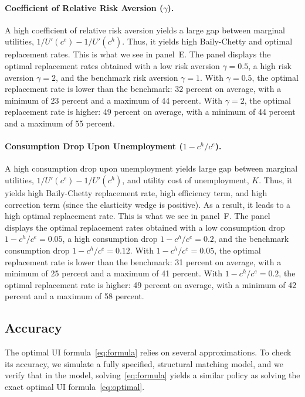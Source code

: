 \documentclass[letterpaper,12pt,leqno]{article}
\def \g{{\gamma}}
\begin{document}
\paragraph{Coefficient of Relative Risk Aversion ($\g$).} A high coefficient of relative risk aversion yields a large gap between marginal utilities, $1/U'(c^e)-1/U'(c^h)$. Thus, it yields high Baily-Chetty and optimal replacement rates. This is what we see in panel~E. The panel displays the optimal replacement rates obtained with a low risk aversion $\g=0.5$, a high risk aversion $\g=2$, and the benchmark risk aversion $\g=1$. With $\g=0.5$, the optimal replacement rate is lower than the benchmark: 32 percent on average, with a minimum of 23 percent and a maximum of 44 percent. With $\g=2$, the optimal replacement rate is higher:  49 percent on average, with a minimum of 44 percent and a maximum of 55 percent.

\paragraph{Consumption Drop Upon Unemployment ($1-c^{h}/c^{e}$).} A high consumption drop upon unemployment yields large gap between marginal utilities, $1/U'(c^e)-1/U'(c^h)$, and utility cost of unemployment, $K$. Thus, it yields high Baily-Chetty replacement rate, high efficiency term, and high correction term (since the elasticity wedge is positive). As a result, it leads to a high optimal replacement rate. This is what we see in panel~F. The panel displays the optimal replacement rates obtained with a low consumption drop $1-c^{h}/c^{e}=0.05$, a high consumption drop $1-c^{h}/c^{e}=0.2$, and the benchmark consumption drop $1-c^{h}/c^{e}=0.12$. With $1-c^{h}/c^{e}=0.05$, the optimal replacement rate is lower than the benchmark: 31 percent on average, with a minimum of 25 percent and a maximum of 41 percent. With $1-c^{h}/c^{e}=0.2$, the optimal replacement rate is higher:  49 percent on average, with a minimum of 42 percent and a maximum of 58 percent.

\subsection{Accuracy}

The optimal UI formula~\eqref{eq:formula} relies on several approximations. To check its accuracy, we simulate a fully specified, structural matching model, and we verify that in the model, solving~\eqref{eq:formula} yields a similar policy as solving the exact optimal UI formula~\eqref{eq:optimal}. 
\end{document}
